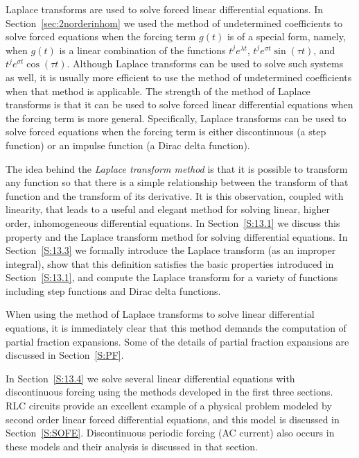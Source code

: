 \label{C:LT}

\normalsize

Laplace transforms are used to solve forced linear differential equations.  
In Section~\ref{sec:2norderinhom} we used the method of undetermined 
coefficients to solve forced equations when the forcing term $g(t)$ is of a 
special form, namely, when $g(t)$ is a linear combination of the functions 
$t^je^{\lambda t}$, $t^je^{\sigma t}\sin(\tau t)$, and 
$t^je^{\sigma t}\cos(\tau t)$.  Although Laplace transforms can be used to 
solve such systems as well, it is usually more efficient to use the method of 
undetermined coefficients when that method is applicable.  The strength of the 
method of Laplace transforms is that it can be used to solve forced linear 
differential equations when the forcing term is more general.  Specifically,
Laplace transforms can be used to solve forced equations when the forcing
term is either discontinuous (a step function) or an impulse function (a Dirac 
delta function).

The idea behind the {\em Laplace transform method} is that it is possible to 
transform any function so that there is a simple relationship between the 
transform of that function and the transform of its derivative.  It is this 
observation, coupled with linearity, that leads to a useful and elegant
method for solving linear, higher order, inhomogeneous differential equations.
In Section~\ref{S:13.1} we discuss this property and the Laplace
transform method for solving differential equations.  In Section~\ref{S:13.3}
we formally introduce the Laplace transform (as an improper integral), show
that this definition satisfies the basic properties introduced in
Section~\ref{S:13.1}, and compute the Laplace transform for a variety of
functions including step functions and Dirac delta functions.

When using the method of Laplace transforms to solve linear differential
equations, it is immediately clear that this method demands the computation of 
partial fraction expansions.  Some of the details of partial fraction
expansions are discussed in Section~\ref{S:PF}.  

In Section~\ref{S:13.4} we solve several linear differential equations with
discontinuous forcing using the methods developed in the first three sections. 
RLC circuits provide an excellent example of a physical problem modeled by
second order linear forced differential equations, and this model is discussed
in Section~\ref{S:SOFE}.  Discontinuous periodic forcing (AC current) also
occurs in these models and their analysis is discussed in that section.


